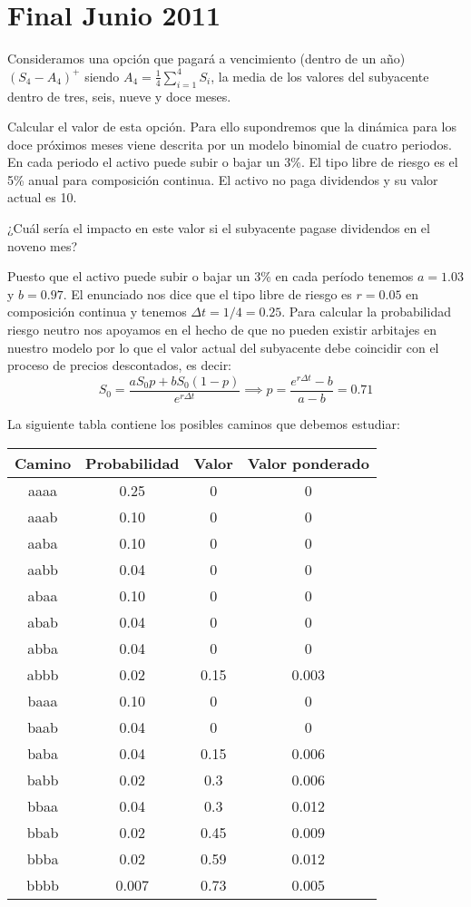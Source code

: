 \section{Final Junio 2011}
\begin{problem}[1]
Consideramos una opción que pagará a vencimiento (dentro de un año) $(S_4-A_4)^+$ siendo $A_4=\frac{1}{4}\sum_{i=1}^4S_i$, la media de los valores del subyacente dentro de tres, seis, nueve y doce meses.

\ppart Calcular el valor de esta opción. Para ello supondremos que la dinámica para los doce próximos meses viene descrita por un modelo binomial de cuatro periodos. En cada periodo el activo puede subir o bajar un 3\%. El tipo libre de riesgo es el 5\% anual para composición continua. El activo no paga dividendos y su valor actual es 10.

\ppart ¿Cuál sería el impacto en este valor si el subyacente pagase dividendos en el noveno mes?

\solution
{}

\spart

Puesto que el activo puede subir o bajar un 3\% en cada período tenemos $a=1.03$ y $b=0.97$. El enunciado nos dice que el tipo libre de riesgo es $r=0.05$ en composición continua y tenemos $Δt=1/4=0.25$. Para calcular la probabilidad riesgo neutro nos apoyamos en el hecho de que no pueden existir arbitajes en nuestro modelo por lo que el valor actual del subyacente debe coincidir con el proceso de precios descontados, es decir:
\[S_0 = \frac{aS_0p + bS_0(1-p)}{e^{rΔt}} \implies p = \frac{e^{rΔt}-b}{a-b} = 0.71\]

La siguiente tabla contiene los posibles caminos que debemos estudiar:

\begin{center}
\begin{tabular}{|c|c|c|c|}
\hline
\textbf{Camino} & \textbf{Probabilidad} & \textbf{Valor} & \textbf{Valor ponderado}\\
\hline
aaaa & 0.25 & 0 & 0 \\
aaab & 0.10 & 0 & 0 \\
aaba & 0.10 & 0 & 0 \\
aabb & 0.04 & 0 & 0 \\
abaa & 0.10 & 0 & 0 \\
abab & 0.04 & 0 & 0 \\
abba & 0.04 & 0 & 0 \\
abbb & 0.02 & 0.15 & 0.003 \\
baaa & 0.10 & 0 & 0 \\
baab & 0.04 & 0 & 0 \\
baba & 0.04 & 0.15 & 0.006 \\
babb & 0.02 & 0.3 & 0.006 \\
bbaa & 0.04 & 0.3 & 0.012 \\
bbab & 0.02 & 0.45 & 0.009 \\
bbba & 0.02 & 0.59 & 0.012 \\
bbbb & 0.007 & 0.73 & 0.005 \\
\hline
\end{tabular}
\end{center}


\end{problem}
